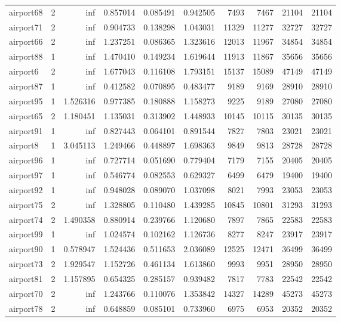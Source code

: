 \begin{longtable}{|l|r|r|r|r|r|r|r|r|r|}
airport68 & 2 & inf & 0.857014 & 0.085491 & 0.942505 & 7493 & 7467 & 21104 & 21104 \\
airport71 & 2 & inf & 0.904733 & 0.138298 & 1.043031 & 11329 & 11277 & 32727 & 32727 \\
airport66 & 2 & inf & 1.237251 & 0.086365 & 1.323616 & 12013 & 11967 & 34854 & 34854 \\
airport88 & 1 & inf & 1.470410 & 0.149234 & 1.619644 & 11913 & 11867 & 35656 & 35656 \\
airport6 & 2 & inf & 1.677043 & 0.116108 & 1.793151 & 15137 & 15089 & 47149 & 47149 \\
airport87 & 1 & inf & 0.412582 & 0.070895 & 0.483477 & 9189 & 9169 & 28910 & 28910 \\
airport95 & 1 & 1.526316 & 0.977385 & 0.180888 & 1.158273 & 9225 & 9189 & 27080 & 27080 \\
airport65 & 2 & 1.180451 & 1.135031 & 0.313902 & 1.448933 & 10145 & 10115 & 30135 & 30135 \\
airport91 & 1 & inf & 0.827443 & 0.064101 & 0.891544 & 7827 & 7803 & 23021 & 23021 \\
airport8 & 1 & 3.045113 & 1.249466 & 0.448897 & 1.698363 & 9849 & 9813 & 28728 & 28728 \\
airport96 & 1 & inf & 0.727714 & 0.051690 & 0.779404 & 7179 & 7155 & 20405 & 20405 \\
airport97 & 1 & inf & 0.546774 & 0.082553 & 0.629327 & 6499 & 6479 & 19400 & 19400 \\
airport92 & 1 & inf & 0.948028 & 0.089070 & 1.037098 & 8021 & 7993 & 23053 & 23053 \\
airport75 & 2 & inf & 1.328805 & 0.110480 & 1.439285 & 10845 & 10801 & 31293 & 31293 \\
airport74 & 2 & 1.490358 & 0.880914 & 0.239766 & 1.120680 & 7897 & 7865 & 22583 & 22583 \\
airport99 & 1 & inf & 1.024574 & 0.102162 & 1.126736 & 8277 & 8247 & 23917 & 23917 \\
airport90 & 1 & 0.578947 & 1.524436 & 0.511653 & 2.036089 & 12525 & 12471 & 36499 & 36499 \\
airport73 & 2 & 1.929547 & 1.152726 & 0.461134 & 1.613860 & 9993 & 9951 & 28950 & 28950 \\
airport81 & 2 & 1.157895 & 0.654325 & 0.285157 & 0.939482 & 7817 & 7783 & 22542 & 22542 \\
airport70 & 2 & inf & 1.243766 & 0.110076 & 1.353842 & 14327 & 14289 & 45273 & 45273 \\
airport78 & 2 & inf & 0.648859 & 0.085101 & 0.733960 & 6975 & 6953 & 20352 & 20352 \\

\end{longtable}
